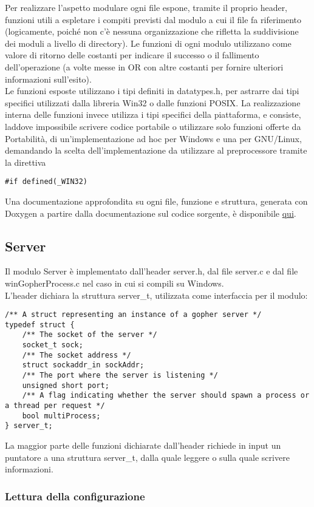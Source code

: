 \documentclass{article}
\begin{document}
Per realizzare l'aspetto modulare ogni file espone, tramite il proprio header, funzioni utili a espletare
i compiti previsti dal modulo a cui il file fa riferimento (logicamente, poiché non c'è nessuna organizzazione
che rifletta la suddivisione dei moduli a livello di directory). Le funzioni di ogni modulo
utilizzano come valore di ritorno delle costanti per indicare il successo o il fallimento dell'operazione (a volte
messe in OR con altre costanti per fornire ulteriori informazioni sull'esito).
\\Le funzioni esposte utilizzano i tipi definiti in datatypes.h, per astrarre dai tipi specifici utilizzati
dalla libreria Win32 o dalle funzioni POSIX. La realizzazione interna delle funzioni invece
 utilizza i tipi specifici della piattaforma, e consiste, laddove impossibile scrivere codice portabile o utilizzare solo funzioni offerte da Portabilità,
 di un'implementazione ad hoc per Windows e una per GNU/Linux, demandando la scelta dell'implementazione
da utilizzare al preprocessore tramite la direttiva 
\begin{lstlisting} 
#if defined(_WIN32) 
\end{lstlisting}
Una documentazione approfondita su ogni file, funzione e struttura, generata con Doxygen a partire dalla 
documentazione sul codice sorgente, è disponibile \href{html/index.html}{qui}. 

\subsection{Server}
Il modulo Server è implementato dall'header server.h, dal file server.c e dal file winGopherProcess.c 
nel caso in cui si compili su Windows.\\
L'header dichiara la struttura server\_t, utilizzata come interfaccia per il modulo:
\begin{lstlisting}
/** A struct representing an instance of a gopher server */
typedef struct {
    /** The socket of the server */
    socket_t sock;
    /** The socket address */
    struct sockaddr_in sockAddr;
    /** The port where the server is listening */
    unsigned short port;
    /** A flag indicating whether the server should spawn a process or a thread per request */
    bool multiProcess;
} server_t;
\end{lstlisting}
La maggior parte delle funzioni dichiarate dall'header richiede in input
un puntatore a una struttura server\_t, dalla quale leggere o sulla quale scrivere informazioni.

\subsubsection{Lettura della configurazione}
\end{document}
